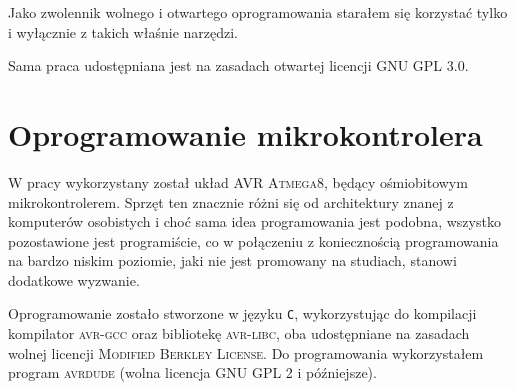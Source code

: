 \label{ch:implementation}

Jako zwolennik wolnego i otwartego oprogramowania starałem się korzystać tylko i wyłącznie z takich właśnie narzędzi.

Sama praca udostępniana jest na zasadach otwartej licencji \textsc{GNU GPL 3.0}.

\section{Oprogramowanie mikrokontrolera}
W pracy wykorzystany został układ \textsc{AVR Atmega8}, będący ośmiobitowym mikrokontrolerem. Sprzęt ten znacznie różni się od architektury znanej z komputerów osobistych  i choć sama idea programowania jest podobna, wszystko pozostawione jest programiście, co w połączeniu z koniecznością programowania na bardzo niskim poziomie, jaki nie jest promowany na studiach, stanowi dodatkowe wyzwanie.

Oprogramowanie zostało stworzone w języku \texttt{C}, wykorzystując do kompilacji kompilator \textsc{avr-gcc} oraz bibliotekę \textsc{avr-libc}, oba udostępniane na zasadach wolnej licencji \textsc{Modified Berkley License}. Do programowania wykorzystałem program \textsc{avrdude} (wolna licencja \textsc{GNU GPL 2} i późniejsze).

